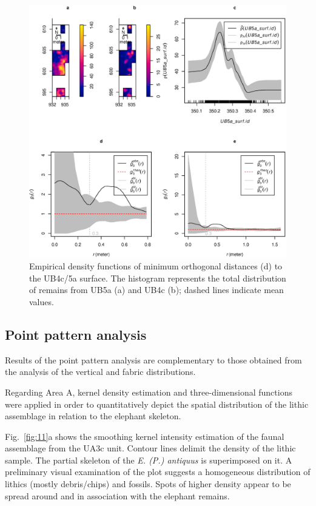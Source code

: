 \documentclass[preprint,authoryear,times]{elsarticle} %
\begin{document}
\begin{figure}[]
  \centering
  \includegraphics[width=1\textwidth]{../artwork/Fig10.eps}
  \caption{Empirical density functions of minimum orthogonal distances (d) to the UB4c/5a surface. The histogram represents the total distribution of remains from UB5a (a) and UB4c (b); dashed lines indicate mean values.}
  \label{fig:10}
\end{figure}

\subsection{Point pattern analysis}

Results of the point pattern analysis are complementary to those obtained from the analysis of the vertical and fabric distributions.  


Regarding Area A, kernel density estimation and three-dimensional functions were applied in order to quantitatively depict the spatial distribution of the lithic assemblage in relation to the elephant skeleton.

Fig.~\ref{fig:11}a shows the smoothing kernel intensity estimation of the %
faunal assemblage from the UA3c unit. Contour lines delimit the density of the lithic sample. The partial skeleton of the \emph{E. (P.) antiquus} is superimposed on it. A preliminary visual examination of the plot suggests a homogeneous distribution of lithics (mostly debris/chips) and fossils. Spots of higher density appear to be spread around and in association with the elephant remains.
\end{document}
